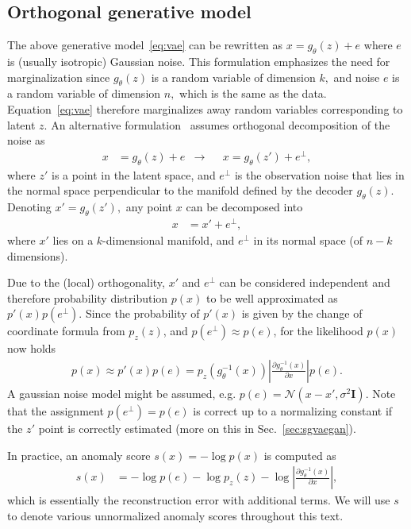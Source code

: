 \subsection{Orthogonal generative model}
The above generative model~\eqref{eq:vae} can be rewritten as $x=g_{\theta}(z)+e$ where $e$ is (usually isotropic) Gaussian noise. This formulation  emphasizes the need for marginalization since $g_{\theta}(z)$ is a random variable of dimension $k,$ and noise $e$ is a random variable of dimension $n,$ which is the same as the data. Equation~\eqref{eq:vae} therefore marginalizes away random variables corresponding to latent $z.$ An alternative formulation~\cite{pidhorskyi2018generative, vsmidl2019anomaly} assumes orthogonal decomposition of the noise as
\begin{align}
x&=g_{\theta}(z)+e & \rightarrow & &x=g_{\theta}(z')+e^{\bot},
\end{align}
where $z'$ is a point in the latent space, and $e^{\bot}$ is the observation noise that lies in the normal space perpendicular to the manifold defined by the decoder $g_{\theta}(z)$. Denoting $x'=g_{\theta}(z'),$ any point $x$ can be decomposed  into 
\begin{align*}
x & =x'+e^{\bot},
\end{align*}
where $x'$ lies on a $k$-dimensional manifold, and $e^{\bot}$ in its normal space (of $n-k$ dimensions). 

Due to the (local) orthogonality, $x'$ and $e^{\bot}$ can be considered independent and therefore probability distribution $p(x)$ to be well approximated as $p'(x)p(e^{\bot})$. Since the probability of $p'(x)$ is given by the change of coordinate formula from $p_{z}(z)$, and $p(e^{\bot})\approx p(e)$, for the likelihood $p(x)$ now holds
\begin{align}
p(x)\approx p'(x)p(e)=p_{z}(g_{\theta}^{-1}(x))\left\vert \frac{\partial g_{\theta}^{-1}(x)}{\partial x}\right\vert p(e).\label{eq:pxjacodeco}
\end{align}
A gaussian noise model might be assumed, e.g. $p(e) = \mathcal{N}(x-x',\sigma^{2}\mathbf{I})$. Note that the assignment $p(e^{\bot})=p(e)$ is correct up to a normalizing constant if the $z'$ point is correctly estimated (more on this in Sec.~\ref{sec:sgvaegan}).

In practice, an anomaly score $s(x) = - \log p(x)$ is computed as
\begin{align}
s(x) & = - \log p(e) -\log p_{z}(z)-\log\left\vert \frac{\partial g_{\theta}^{-1}(x)}{\partial x}\right\vert ,\label{eq:jacodeco}
\end{align}
which is essentially the reconstruction error with additional terms. We will use $s$ to denote various unnormalized anomaly scores throughout this text.

